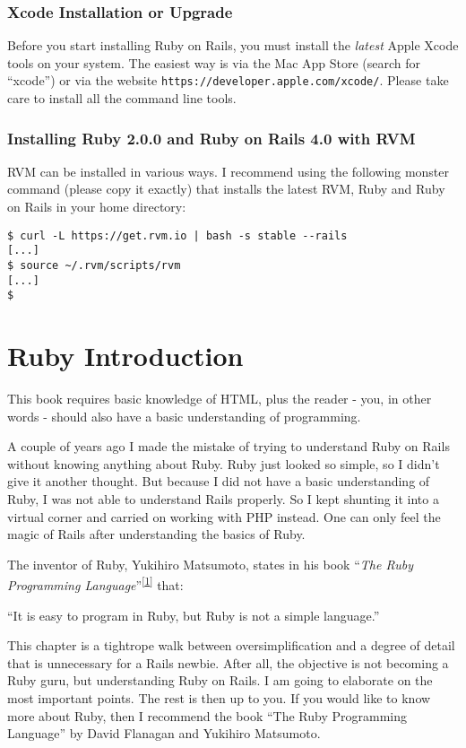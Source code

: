 \documentclass[a4paper]{book}
\newcounter{tab}[chapter]
\newcommand{\chap}[1]{\newpage\thispagestyle{empty}\chapter{#1}\label{chap:\thechapter}}
\begin{document}
\subsection{Xcode Installation or Upgrade}\label{xcode-installation-or-upgrade}

Before you start installing Ruby on Rails, you must install the \emph{latest} Apple Xcode tools on your system. The easiest way is via the Mac App Store (search for “xcode”) or via the website \texttt{https://developer.apple.com/xcode/}. Please take care to install all the command line tools.

\subsection{Installing Ruby 2.0.0 and Ruby on Rails 4.0 with RVM}\label{installing-ruby-2.0.0-and-ruby-on-rails-4.0-with-rvm-1}

RVM can be installed in various ways. I recommend using the following monster command (please copy it exactly) that installs the latest RVM, Ruby and Ruby on Rails in your home directory:

\begin{shaded}\begin{verbatim}
$ curl -L https://get.rvm.io | bash -s stable --rails
[...]
$ source ~/.rvm/scripts/rvm
[...]
$
\end{verbatim}\end{shaded}

\chap{Ruby Introduction}\label{ruby-introduction}

This book requires basic knowledge of HTML, plus the reader - you, in other words - should also have a basic understanding of programming.

A couple of years ago I made the mistake of trying to understand Ruby on Rails without knowing anything about Ruby. Ruby just looked so simple, so I didn't give it another thought. But because I did not have a basic understanding of Ruby, I was not able to understand Rails properly. So I kept shunting it into a virtual corner and carried on working with PHP instead. One can only feel the magic of Rails after understanding the basics of Ruby.

The inventor of Ruby, Yukihiro Matsumoto, states in his book “\emph{The Ruby Programming Language}”\textsuperscript{{[}\hyperref[ftn.idp1281296]{1}{]}} that:

“It is easy to program in Ruby, but Ruby is not a simple language.”

This chapter is a tightrope walk between oversimplification and a degree of detail that is unnecessary for a Rails newbie. After all, the objective is not becoming a Ruby guru, but understanding Ruby on Rails. I am going to elaborate on the most important points. The rest is then up to you. If you would like to know more about Ruby, then I recommend the book “The Ruby Programming Language” by David Flanagan and Yukihiro Matsumoto.
\end{document}
